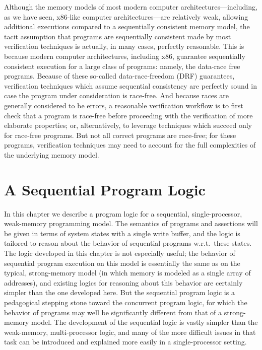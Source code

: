 \documentclass[11pt]{report}
\begin{document}
Although the memory models of most modern computer architectures---including, as we have seen, x86-like computer architectures---are relatively weak, allowing additional executions compared to a sequentially consistent memory model, the tacit assumption that programs are sequentially consistent made by most verification techniques is actually, in many cases, perfectly reasonable. This is because modern computer architectures, including x86, guarantee sequentially consistent execution for a large class of programs: namely, the data-race free programs. Because of these so-called data-race-freedom (DRF) guarantees, verification techniques which assume sequential consistency are perfectly sound in case the program under consideration is race-free. And because races are generally considered to be errors, a reasonable verification workflow is to first check that a program is race-free before proceeding with the verification of more elaborate properties; or, alternatively, to leverage techniques which succeed only for race-free programs. But not all correct programs are race-free; for these programs, verification techniques may need to account for the full complexities of the underlying memory model. 

\chapter{A Sequential Program Logic}
\label{ch:uniprocessor}

In this chapter we describe a program logic for a sequential, single-processor, weak-memory programming model. The semantics of programs and assertions will be given in terms of system states with a single write buffer, and the logic is tailored to reason about the behavior of sequential programs w.r.t.\ these states. The logic developed in this chapter is not especially useful; the behavior of sequential program execution on this model is essentially the same as on the typical, strong-memory model (in which memory is modeled as a single array of addresses), and existing logics for reasoning about this behavior are certainly simpler than the one developed here. But the sequential program logic is a pedagogical stepping stone toward the concurrent program logic, for which the behavior of programs may well be significantly different from that of a strong-memory model. The development of the sequential logic is vastly simpler than the weak-memory, multi-processor logic, and many of the more difficult issues in that task can be introduced and explained more easily in a single-processor setting. 
\end{document}
